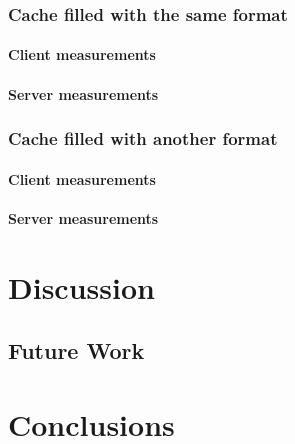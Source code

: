 \documentclass[twoside,openright]{uva-bachelor-thesis}
\begin{document}
\subsection{Cache filled with the same format}
\subsubsection{Client measurements}



\subsubsection{Server measurements}




\subsection{Cache filled with another format}
\subsubsection{Client measurements}



\subsubsection{Server measurements}





\chapter{Discussion}
\section{Future Work}
\chapter{Conclusions}


\printbibliography[heading=bibintoc]{}

\printglossaries{}
\end{document}

